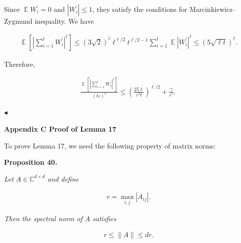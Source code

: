 Since $\operatorname*{\mathbb{E}}W_{i}^{\prime}=0$ and $|W_{i}^{\prime}|\leq 1$,
they satisfy the conditions for Marcinkiewicz–Zygmund inequality. We have\par


\[\begin{gathered}
\displaystyle\operatorname*{\mathbb{E}}\left[\left|\sum_{i=1}^{t}W_{i}^{\prime}\right|^{\ell}\right]\leq(3\sqrt{2})^{\ell}\ell^{\ell/2}t^{\ell/2-1}\sum_{i=1}^{t}\operatorname*{\mathbb{E}}|W_{i}^{\prime}|^{\ell}\leq(5\sqrt{\ell t})^{\ell}.
\end{gathered}\]


Therefore,\par


\[\begin{gathered}
\frac{\operatorname*{\mathbb{E}}\left[\left|\sum_{i=1}^{t}W_{i}\right|^{\ell}\right]}{(t\varepsilon)^{\ell}}\leq\left(\frac{25{\ell}}{\varepsilon^{2}{t}}\right)^{\ell/2}+\frac{\gamma}{\varepsilon^{\ell}}.\
\end{gathered}\]


$\blacktriangleleft$\par






\par\medskip\noindent\textbf{
Appendix C Proof of Lemma 17
}\par




To prove Lemma 17, we need the following property of matrix norms:\par





\par\medskip\noindent\textbf{
\textbf{Proposition 40}\textbf{.}
}\par



\emph{Let $A\in\mathbb{C}^{d\times d}$ and define}\par


\[\begin{gathered}
r=\max_{i,j}|A_{ij}|.
\end{gathered}\]


\emph{Then the spectral norm of $A$ satisfies}\par


\[\begin{gathered}
r\leq\|A\|\leq dr.
\end{gathered}\]



